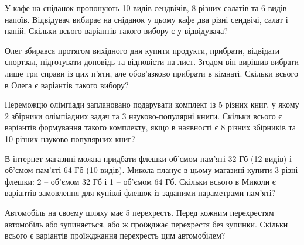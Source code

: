 \documentclass[12pt]{article}
\begin{document}
\begin{samepage}
\noindent\zadnum У кафе на сніданок пропонують 10 видів сендвічів, 8 різних салатів та 6 видів напоїв. Відвідувач вибирає на сніданок у цьому кафе два різні сендвічі, салат і напій. Скільки всього варіантів такого вибору є у відвідувача? 

\nmtnobreak
\nopagebreak\nbvspace{0.5cm}
\nmtAnswerBox
\par{}
\end{samepage}

\begin{samepage}
\noindent\zadnum Олег збирався протягом вихідного дня купити продукти, прибрати, відвідати спортзал, підготувати доповідь та відповісти на лист. Згодом він вирішив вибрати лише три справи із цих п’яти, але обов’язково прибрати в кімнаті. Скільки всього в Олега є варіантів такого вибору? 

\nmtnobreak
\nopagebreak\nbvspace{0.5cm}
\nmtAnswerBox
\par{}
\end{samepage}

\begin{samepage}
\noindent\zadnum Переможцю олімпіади заплановано подарувати комплект із 5 різних книг, у якому 2 збірники олімпіадних задач та 3 науково-популярні книги. Скільки всього є варіантів формування такого комплекту, якщо в наявності є 8 різних збірників та 10 різних науково-популярних книг? 

\nmtnobreak
\nopagebreak\nbvspace{0.5cm}
\nmtAnswerBox
\par{}
\end{samepage}

\begin{samepage}
\noindent\zadnum В інтернет-магазині можна придбати флешки об’ємом пам’яті 32 Гб (12 видів) і об’ємом пам’яті 64 Гб (10 видів). Микола планує в цьому магазині купити 3 різні флешки: 2 – об’ємом 32 Гб і 1 – об’ємом 64 Гб. Скільки всього в Миколи є варіантів замовлення для купівлі флешок із заданими параметрами пам’яті? 

\nmtnobreak
\nopagebreak\nbvspace{0.5cm}
\nmtAnswerBox
\par{}
\end{samepage}

\begin{samepage}
\noindent\zadnum Автомобіль на своєму шляху має 5 перехресть. Перед кожним перехрестям автомобіль або зупиняється, або ж проїжджає перехрестя без зупинки. Скільки всього є варіантів проїжджання перехресть цим автомобілем? 

\nmtnobreak
\nopagebreak\nbvspace{0.5cm}
\nmtAnswerBox
\par{}
\end{samepage}
\end{document}
